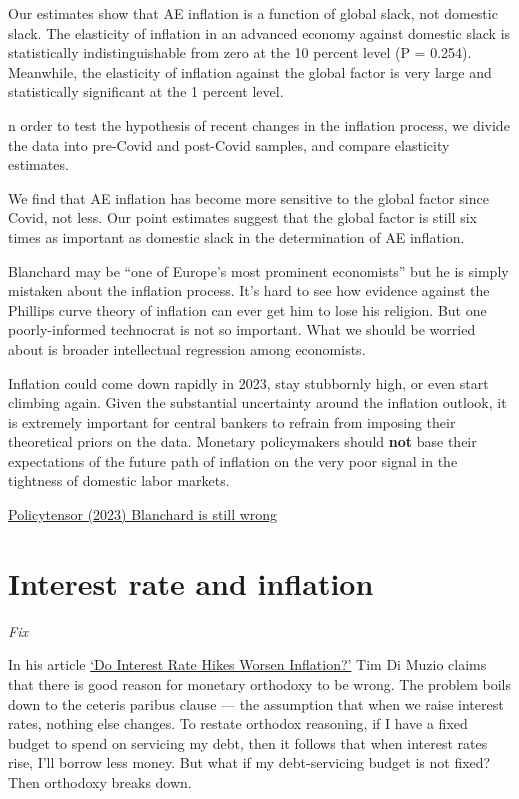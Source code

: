 \documentclass[
]{book}
\begin{document}
Our estimates show that AE inflation is a function of global slack, not domestic slack. The elasticity of inflation in an advanced economy against domestic slack is statistically indistinguishable from zero at the 10 percent level (P = 0.254). Meanwhile, the elasticity of inflation against the global factor is very large and statistically significant at the 1 percent level.

n order to test the hypothesis of recent changes in the inflation process, we divide the data into pre-Covid and post-Covid samples, and compare elasticity estimates.

We find that AE inflation has become more sensitive to the global factor since Covid, not less.
Our point estimates suggest that the global factor is still six times as important as domestic slack in the determination of AE inflation.

Blanchard may be ``one of Europe's most prominent economists'' but he is simply mistaken about the inflation process. It's hard to see how evidence against the Phillips curve theory of inflation can ever get him to lose his religion. But one poorly-informed technocrat is not so important. What we should be worried about is broader intellectual regression among economists.

Inflation could come down rapidly in 2023, stay stubbornly high, or even start climbing again. Given the substantial uncertainty around the inflation outlook, it is extremely important for central bankers to refrain from imposing their theoretical priors on the data. Monetary policymakers should \textbf{not} base their expectations of the future path of inflation on the very poor signal in the tightness of domestic labor markets.

\href{https://policytensor.substack.com/p/blanchard-is-still-wrong-about-inflation}{Policytensor (2023) Blanchard is still wrong}

\hypertarget{interest-rate-and-inflation}{%
\section{Interest rate and inflation}\label{interest-rate-and-inflation}}

\emph{Fix}

In his article \href{https://strangematters.coop/interest-rate-hikes-worsen-inflation-volcker-shock/}{`Do Interest Rate Hikes Worsen Inflation?'} Tim Di Muzio claims that there is good reason for monetary orthodoxy to be wrong. The problem boils down to the ceteris paribus clause --- the assumption that when we raise interest rates, nothing else changes. To restate orthodox reasoning, if I have a fixed budget to spend on servicing my debt, then it follows that when interest rates rise, I'll borrow less money. But what if my debt-servicing budget is not fixed? Then orthodoxy breaks down.
\end{document}
